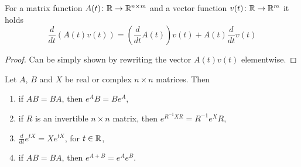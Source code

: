 \begin{lemma}
\label{lem:matrixTimesVectorDerivative}
	For a matrix function $A(t)\colon\mathbb{R}\to\mathbb{R}^{n\times m}$ and a vector function \linebreak $v(t)\colon\mathbb{R}\to\mathbb{R}^m$ it holds 
	$$\frac{d}{dt}\left(A(t)v(t)\right)=\left(\frac{d}{dt}A(t)\right)v(t)+A(t)\frac{d}{dt}v(t)$$
\end{lemma}
	
\begin{proof}
	Can be simply shown by rewriting the vector $A(t)v(t)$ elementwise.
\end{proof}

\begin{lemma}
\label{lem:expprop}
	Let $A$, $B$ and $X$ be real or complex $n\times n$ matrices. Then 
	\begin{enumerate}
		\item if $AB = BA$, then $e^{A}B = Be^{A}$,
		\item if $R$ is an invertible $n\times n$ matrix, then $e^{R^{-1}XR}=R^{-1}e^XR$,
		\item $\frac{d}{dt}e^{tX}=Xe^{tX}$, for $t \in \mathbb{R}$,
		\item if $AB = BA$, then $e^{A+B} = e^{A}e^B$.
	\end{enumerate}
\end{lemma}

